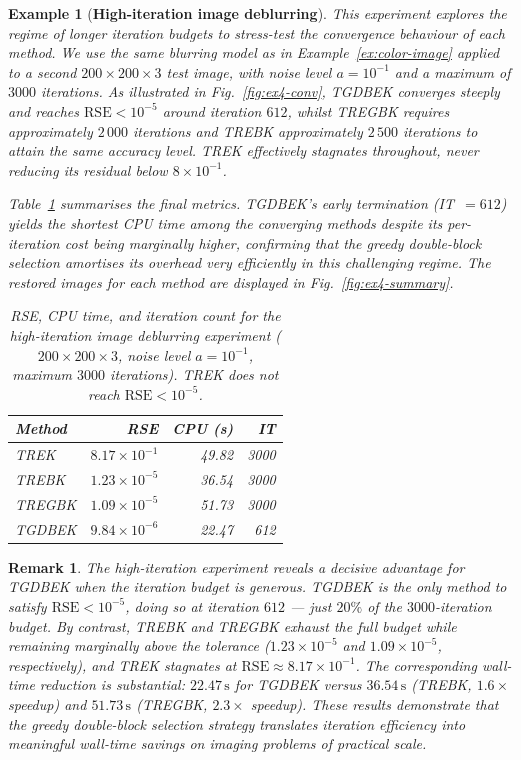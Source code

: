 \documentclass[11pt]{article}
\newtheorem{example}[theorem]{Example}
\newtheorem{remark}[theorem]{Remark}
\begin{document}
\begin{example}[\textbf{High-iteration image deblurring}] \label{ex:gray-image}
This experiment explores the regime of longer iteration budgets to stress-test the convergence behaviour of each method. We use the same blurring model as in Example~\ref{ex:color-image} applied to a second $200\times200\times3$ test image, with noise level $a = 10^{-1}$ and a maximum of $3000$ iterations. As illustrated in Fig.~\ref{fig:ex4-conv}, TGDBEK converges steeply and reaches $\mathrm{RSE} < 10^{-5}$ around iteration $612$, whilst TREGBK requires approximately $2\,000$ iterations and TREBK approximately $2\,500$ iterations to attain the same accuracy level. TREK effectively stagnates throughout, never reducing its residual below $8\times 10^{-1}$.

Table~\ref{tab:ex4} summarises the final metrics. TGDBEK's early termination (IT~$=612$) yields the shortest CPU time among the converging methods despite its per-iteration cost being marginally higher, confirming that the greedy double-block selection amortises its overhead very efficiently in this challenging regime. The restored images for each method are displayed in Fig.~\ref{fig:ex4-summary}.
\begin{table}[ht]
\centering
\begin{tabular}{lrrr}
\toprule
Method & RSE & CPU (s) & IT \\
\midrule
TREK   & $8.17\times10^{-1}$ & 49.82 & 3000 \\
TREBK  & $1.23\times10^{-5}$ & 36.54 & 3000 \\
TREGBK & $1.09\times10^{-5}$ & 51.73 & 3000 \\
TGDBEK & $9.84\times10^{-6}$ & 22.47 &  612 \\
\bottomrule
\end{tabular}
\caption{RSE, CPU time, and iteration count for the high-iteration image deblurring experiment ($200\times200\times3$, noise level $a=10^{-1}$, maximum $3000$ iterations). TREK does not reach $\mathrm{RSE}<10^{-5}$.}
\label{tab:ex4}
\end{table}
\end{example}

\begin{remark}
The high-iteration experiment reveals a decisive advantage for TGDBEK when the iteration budget is generous. TGDBEK is the only method to satisfy $\mathrm{RSE} < 10^{-5}$, doing so at iteration $612$ — just $20\%$ of the $3000$-iteration budget. By contrast, TREBK and TREGBK exhaust the full budget while remaining marginally above the tolerance ($1.23\times10^{-5}$ and $1.09\times10^{-5}$, respectively), and TREK stagnates at $\mathrm{RSE}\approx8.17\times10^{-1}$. The corresponding wall-time reduction is substantial: $22.47\,\mathrm{s}$ for TGDBEK versus $36.54\,\mathrm{s}$ (TREBK, $1.6\times$ speedup) and $51.73\,\mathrm{s}$ (TREGBK, $2.3\times$ speedup). These results demonstrate that the greedy double-block selection strategy translates iteration efficiency into meaningful wall-time savings on imaging problems of practical scale.
\end{remark}
\end{document}
